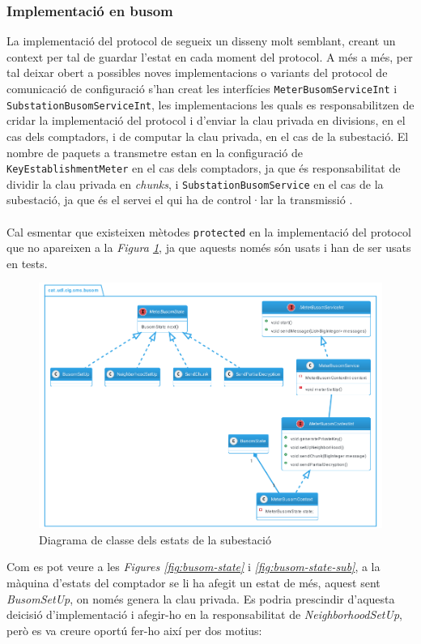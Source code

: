 \subsubsection{Implementació en busom}
La implementació del protocol de \cite{busom} segueix un disseny molt semblant, creant un context per tal de guardar l'estat en cada moment del protocol. A més a més, per tal deixar obert a possibles noves implementacions o variants del protocol de comunicació de configuració s'han creat les interfícies \texttt{MeterBusomServiceInt} i \texttt{SubstationBusomServiceInt}, les implementacions les quals es responsabilitzen de cridar la implementació del protocol i d'enviar la clau privada en divisions, en el cas dels comptadors, i de computar la clau privada, en el cas de la subestació. El nombre de paquets a transmetre estan en la configuració de \texttt{KeyEstablishmentMeter} en el cas dels comptadors, ja que és responsabilitat de \cite{recsi} dividir la clau privada en \textit{chunks}, i \texttt{SubstationBusomService} en el cas de la subestació, ja que és el servei el qui ha de control·lar la transmissió \cite{busom}.
\\
\\
Cal esmentar que existeixen mètodes \texttt{protected} en la implementació del protocol que no apareixen a la \textit{Figura \ref{fig:diss-busom}}, ja que aquests només són usats i han de ser usats en tests.
\begin{figure}[H]
	\centering
	\includegraphics[width=14cm]{classes/busomprot.png}
	\caption{Diagrama de classe dels estats de la subestació}
	\label{fig:diss-busom}
\end{figure}
Com es pot veure a les \textit{Figures \ref{fig:busom-state}} i  \textit{\ref{fig:busom-state-sub}}, a la màquina d'estats del comptador se li ha afegit un estat de més, aquest sent \textit{BusomSetUp}, on només genera la clau privada. Es podria prescindir d'aquesta deicisió d'implementació i afegir-ho en la responsabilitat de \textit{NeighborhoodSetUp}, però es va creure oportú fer-ho així per dos motius:
